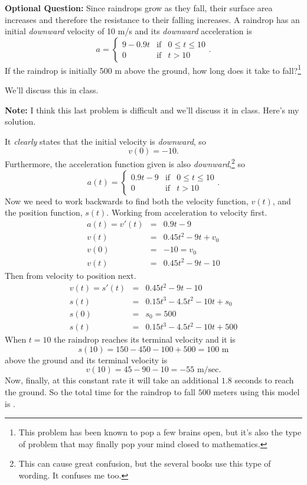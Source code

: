 \documentclass[12pt,addpoints, answers, fleqn]{exam}
\begin{document}
\begin{questions}
\question \textbf{Optional Question:} Since raindrops grow as they fall, their surface area increases and therefore the resistance to their falling increases. A raindrop has an initial \emph{downward} velocity of 10 m/s and its \emph{downward} acceleration is
\[
a =
\left\{
{\begin{array}{lll}
  {9-0.9t} & {\mbox{if}} & {0\leq t \leq 10} \\
  {0} & {\mbox{if}} & {t>10}
\end{array}}
\right..
\]
If the raindrop is initially 500 m above the ground, how long does it take to fall?\footnote{This problem has been known to pop a few brains open, but it's also the type of problem that may finally pop your mind closed to mathematics.} 

\begin{solution}
We'll discuss this in class.

\textbf{Note:} I think this last problem is difficult and we'll discuss it in class. Here's my solution.

It \emph{clearly} states that the initial velocity is \emph{downward}, so
\[
v \left( 0 \right) = -10.
\]
Furthermore, the acceleration function given is also \emph{downward},\footnote{This can cause great confusion, but the several books use this type of wording. It confuses me too.} so
\[
a \left( t \right) =
\left\{
{\begin{array}{lll}
  {0.9t - 9} & {\mbox{if}} & {0\leq t \leq 10} \\
  {0} & {\mbox{if}} & {t>10}
\end{array}}
\right..
\]
Now we need to work backwards to find both the velocity function, $v\left(t\right)$, and the position function, $s\left(t\right)$. Working from acceleration to velocity first.
\begin{eqnarray*}
a\left(t\right) = v'\left(t\right) &=& 0.9t -9\\
v\left(t\right) &=& 0.45t^2 - 9t + v_0\\
v\left(0\right) &=& -10 = v_0\\
v\left(t\right) &=& 0.45t^2 - 9t - 10
\end{eqnarray*}
Then from velocity to position next.
\begin{eqnarray*}
v\left(t\right) = s'\left(t\right) &=& 0.45t^2 - 9t - 10\\
s\left(t\right) &=& 0.15t^3 - 4.5t^2 - 10t + s_0\\
s\left(0\right) &=&  s_0 =500\\
s\left(t\right) &=& 0.15t^3 - 4.5t^2 - 10t + 500
\end{eqnarray*}
When $t = 10$ the raindrop reaches its terminal velocity and it is
\[
s\left( 10 \right) = 150 - 450 - 100 + 500 = 100 \mbox{ m}
\]
above the ground and its terminal velocity is
\[
v\left(10\right) = 45 - 90 - 10 = -55 \mbox{ m/sec}.
\]
Now, finally, at this constant rate it will take an additional $1.8$ seconds to reach the ground. So the total time for the raindrop to fall $500$ meters using this model is .


\end{solution}
\end{questions}
\end{document}

